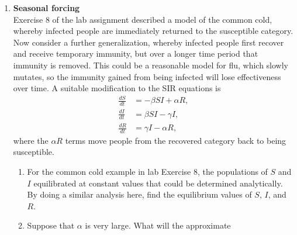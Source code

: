 \documentclass[12pt]{article}
\begin{document}
\begin{enumerate}
\begin{enumerate}
	recovered. Explain what each of these groups are.
      \item A few years ago there was a global fear about a bird flu pandemic.
	Imagine there was a single person in Boston who had bird flu and nobody
	else was exposed to the disease. Explain what the infected,
	susceptible, and recovered populations would be in this case.
      \item The paper makes several assumptions about how a flu epidemic
	progresses through a population. List two of these assumptions.
      \item Explain what is plotted in the figure on page 714.
      \item The central result of the paper is that it proposes a formula for a
	threshold population density above which a flu epidemic will spread and
	potentially become large. What does this threshold population density
	depend upon? \textit{[Hint: See the discussion on page 715. You can ignore
	or skim the dense mathematics that occurs in the pages before
	this---the main point is on this page.]}
    \end{enumerate}
     \item \textbf{Seasonal forcing}\\ Exercise 8 of the lab assignment described a
    model of the common cold, whereby infected people are immediately returned
    to the susceptible category. Now consider a further generalization, whereby
    infected people first recover and receive temporary immunity, but over a
    longer time period that immunity is removed. This could be a reasonable
    model for flu, which slowly mutates, so the immunity gained from being
    infected will lose effectiveness over time. A suitable modification to the
    SIR equations is
    \begin{align*}
      \frac{dS}{dt} &= -\beta S I + \alpha R, \\
      \frac{dI}{dt} &= \beta S I - \gamma I, \\
      \frac{dR}{dt} &= \gamma I - \alpha R,
    \end{align*}
    where the $\alpha R$ terms move people from the recovered category back to
    being susceptible.
    \begin{enumerate}
      \item For the common cold example in lab Exercise 8, the populations of
	$S$ and $I$ equilibrated at constant values that could be determined
	analytically. By doing a similar analysis here, find the equilibrium
	values of $S$, $I$, and $R$.
      \item Suppose that $\alpha$ is very large. What will the approximate

\end{enumerate}
\end{enumerate}
\end{document}
